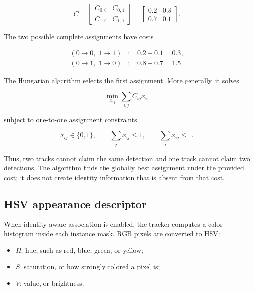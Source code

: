 \documentclass[11pt]{article}
\begin{document}
\begin{equation}
C=
\begin{bmatrix}
C_{0,0} & C_{0,1}\\
C_{1,0} & C_{1,1}
\end{bmatrix}
=
\begin{bmatrix}
0.2 & 0.8\\
0.7 & 0.1
\end{bmatrix}.
\end{equation}

The two possible complete assignments have costs

\begin{align}
(0\rightarrow0,\;1\rightarrow1)&:\quad 0.2+0.1=0.3,\\
(0\rightarrow1,\;1\rightarrow0)&:\quad 0.8+0.7=1.5.
\end{align}

The Hungarian algorithm selects the first assignment. More generally, it
solves

\begin{equation}
\min_{x_{ij}}\sum_{i,j}C_{ij}x_{ij}
\end{equation}

subject to one-to-one assignment constraints

\begin{equation}
x_{ij}\in\{0,1\},
\qquad
\sum_jx_{ij}\le1,
\qquad
\sum_ix_{ij}\le1.
\end{equation}

Thus, two tracks cannot claim the same detection and one track cannot claim
two detections. The algorithm finds the globally best assignment under the
provided cost; it does not create identity information that is absent from
that cost.

\subsection{HSV appearance descriptor}

When identity-aware association is enabled, the tracker computes a color
histogram inside each instance mask. RGB pixels are converted to HSV:

\begin{itemize}
    \item $H$: hue, such as red, blue, green, or yellow;
    \item $S$: saturation, or how strongly colored a pixel is;
    \item $V$: value, or brightness.
\end{itemize}
\end{document}

